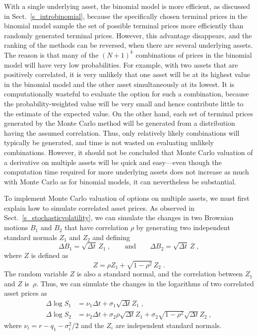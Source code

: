 With a single underlying asset, the binomial model is more efficient, as discussed in Sect.~\ref{s_introbinomial}, because the specifically chosen terminal prices in the binomial model sample the set of possible terminal prices more efficiently than randomly generated terminal prices.  However, this advantage disappears, and the ranking of the methods can be reversed, when there are several underlying assets.  The reason is that many of the $(N+1)^k$ combinations of prices in the binomial model will have very low probabilities.  For example, with two assets that are positively correlated, it is very unlikely that one asset will be at its highest value in the binomial model and the other asset simultaneously at its lowest.  It is computationally wasteful to evaluate the option for such a combination, because the probability-weighted value will be very small and hence contribute little to the estimate of the expected value.  On the other hand, each set of terminal prices generated by the Monte Carlo method will be generated from a distribution having the assumed correlation.  Thus, only relatively likely combinations will typically be generated, and time is not wasted on evaluating unlikely combinations.  However, it should not be concluded that Monte Carlo valuation of a derivative on multiple assets will be quick and easy---even though the computation time required for more underlying assets does not increase as much with Monte Carlo as for binomial models, it can nevertheless be substantial.

To implement Monte Carlo valuation of options on multiple assets, we must first explain how to simulate correlated asset prices.
As observed in Sect.~\ref{s_stochasticvolatility}, we can simulate the changes in two Brownian motions $B_1$ and $B_2$ that have correlation $\rho$ by generating two independent standard normals $Z_1$ and $Z_2$ and defining
$$\varDelta B_1 = \sqrt{\varDelta t}\,Z_1\;, \qquad \text{and} \qquad \varDelta B_2 = \sqrt{\varDelta t}\,Z\; ,$$
where $Z$ is defined as 
$$Z = \rho Z_1 + \sqrt{1-\rho^2}\,Z_2\; .$$
The random variable $Z$ is also a standard normal, and the correlation between $Z_1$ and $Z$ is~$\rho$.  
Thus, we can simulate the changes in the logarithms of two correlated asset prices as
\begin{align*}
\varDelta \log S_1 &= \nu_1\varDelta t + \sigma_1\sqrt{\varDelta t}Z_1 \; ,\\
\varDelta \log S_2 &= \nu_2\varDelta t + \sigma_2\rho\sqrt{\varDelta t}Z_1 + \sigma_2\sqrt{1-\rho^2}\sqrt{\varDelta t}Z_2\;,
\end{align*}
where $\nu_i = r-q_1-\sigma_i^2/2$ and the $Z_i$ are independent standard normals.  

